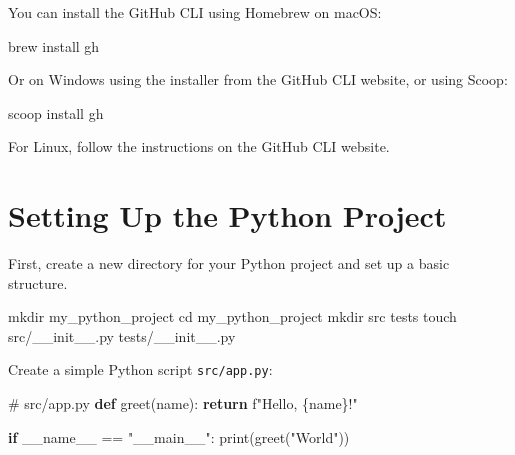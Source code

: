 \documentclass[
  letterpaper,
  DIV=11,
  numbers=noendperiod]{scrreprt}
\newenvironment{Shaded}{\begin{snugshade}}{\end{snugshade}}
\newcommand{\BuiltInTok}[1]{\textcolor[rgb]{0.00,0.23,0.31}{#1}}
\newcommand{\CommentTok}[1]{\textcolor[rgb]{0.37,0.37,0.37}{#1}}
\newcommand{\ControlFlowTok}[1]{\textcolor[rgb]{0.00,0.23,0.31}{\textbf{#1}}}
\newcommand{\ExtensionTok}[1]{\textcolor[rgb]{0.00,0.23,0.31}{#1}}
\newcommand{\FunctionTok}[1]{\textcolor[rgb]{0.28,0.35,0.67}{#1}}
\newcommand{\KeywordTok}[1]{\textcolor[rgb]{0.00,0.23,0.31}{\textbf{#1}}}
\newcommand{\NormalTok}[1]{\textcolor[rgb]{0.00,0.23,0.31}{#1}}
\newcommand{\OperatorTok}[1]{\textcolor[rgb]{0.37,0.37,0.37}{#1}}
\newcommand{\SpecialCharTok}[1]{\textcolor[rgb]{0.37,0.37,0.37}{#1}}
\newcommand{\SpecialStringTok}[1]{\textcolor[rgb]{0.13,0.47,0.30}{#1}}
\newcommand{\StringTok}[1]{\textcolor[rgb]{0.13,0.47,0.30}{#1}}
\newcommand{\VariableTok}[1]{\textcolor[rgb]{0.07,0.07,0.07}{#1}}
\begin{document}
You can install the GitHub CLI using Homebrew on macOS:

\begin{Shaded}
\begin{Highlighting}[]
\ExtensionTok{brew}\NormalTok{ install gh}
\end{Highlighting}
\end{Shaded}

Or on Windows using the installer from the GitHub CLI website, or using
Scoop:

\begin{Shaded}
\begin{Highlighting}[]
\ExtensionTok{scoop}\NormalTok{ install gh}
\end{Highlighting}
\end{Shaded}

For Linux, follow the instructions on the GitHub CLI website.

\section{Setting Up the Python
Project}\label{setting-up-the-python-project}

First, create a new directory for your Python project and set up a basic
structure.

\begin{Shaded}
\begin{Highlighting}[]
\FunctionTok{mkdir}\NormalTok{ my\_python\_project}
\BuiltInTok{cd}\NormalTok{ my\_python\_project}
\FunctionTok{mkdir}\NormalTok{ src tests}
\FunctionTok{touch}\NormalTok{ src/\_\_init\_\_.py tests/\_\_init\_\_.py}
\end{Highlighting}
\end{Shaded}

Create a simple Python script \texttt{src/app.py}:

\begin{Shaded}
\begin{Highlighting}[]
\CommentTok{\# src/app.py}
\KeywordTok{def}\NormalTok{ greet(name):}
    \ControlFlowTok{return} \SpecialStringTok{f"Hello, }\SpecialCharTok{\{}\NormalTok{name}\SpecialCharTok{\}}\SpecialStringTok{!"}

\ControlFlowTok{if} \VariableTok{\_\_name\_\_} \OperatorTok{==} \StringTok{"\_\_main\_\_"}\NormalTok{:}
    \BuiltInTok{print}\NormalTok{(greet(}\StringTok{"World"}\NormalTok{))}
\end{Highlighting}
\end{Shaded}
\end{document}
